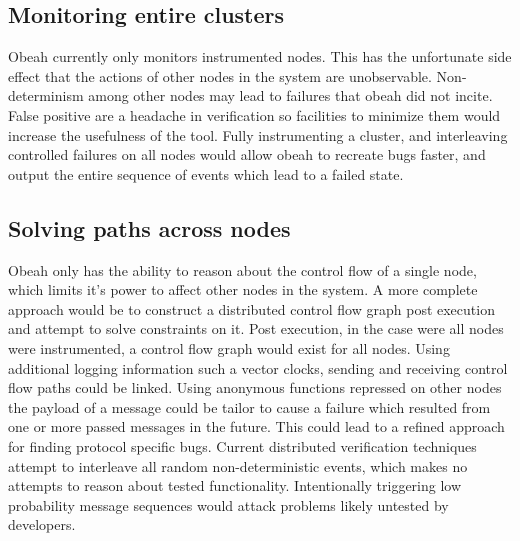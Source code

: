 \subsection{Monitoring entire clusters}

Obeah currently only monitors instrumented nodes. This has the unfortunate side
effect that the actions of other nodes in the system are unobservable.
Non-determinism among other nodes may lead to failures that obeah did not
incite. False positive are a headache in verification so facilities to minimize
them would increase the usefulness of the tool. Fully instrumenting a cluster,
and interleaving controlled failures on all nodes would allow obeah to recreate
bugs faster, and output the entire sequence of events which lead to a failed
state.

\subsection{Solving paths across nodes}

Obeah only has the ability to reason about the control flow of a single node,
which limits it's power to affect other nodes in the system. A more complete
approach would be to construct a distributed control flow graph post execution
and attempt to solve constraints on it. Post execution, in the case were all
nodes were instrumented, a control flow graph would exist for all nodes. Using
additional logging information such a vector clocks, sending and receiving
control flow paths could be linked. Using anonymous functions repressed on other
nodes the payload of a message could be tailor to cause a failure which
resulted from one or more passed messages in the future. This could
lead to a refined approach for finding protocol specific bugs. Current
distributed verification techniques attempt to interleave all random
non-deterministic events, which makes no attempts to reason about tested
functionality. Intentionally triggering low probability message sequences would
attack problems likely untested by developers.
